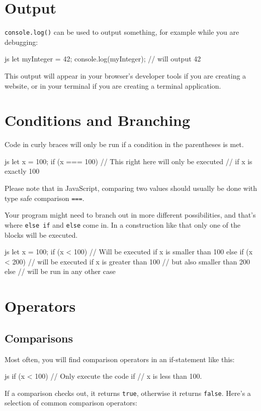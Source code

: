 \documentclass[10pt,a4paper]{article}
\begin{document}
\begin{multicols}{3}
\section*{Output}
\texttt{console.log()} can be used to output something, for example while you are debugging:
\begin{codebox}{js}{}
let myInteger = 42;
console.log(myInteger); // will output 42
\end{codebox}
This output will appear in your browser's developer tools if you are creating a website, or in your terminal if you are creating a terminal application.


\section*{Conditions and Branching}
Code in curly braces will only be run if a condition in the parentheses is met.

\begin{codebox}{js}{}
  let x = 100;
  if (x === 100) {
    // This right here will only be executed
    // if x is exactly 100
  }
\end{codebox}
Please note that in JavaScript, comparing two values should usually be done with type safe comparison \texttt{===}.

Your program might need to branch out in more different possibilities, and that's where \texttt{else if} and \texttt{else} come in. In a construction like that only one of the blocks will be executed.
\begin{codebox}{js}{}
  let x = 100;
  if (x < 100) {
    // Will be executed if x is smaller than 100
  } else if (x < 200) {
    // will be executed if x is greater than 100
    // but also smaller than 200
  } else {
    // will be run in any other case
  }
\end{codebox}


\section*{Operators}
\subsection*{Comparisons}
Most often, you will find comparison operators in an if-statement like this:

\begin{codebox}{js}{}
  if (x < 100) {
    // Only execute the code if
    // x is less than 100.
  }
\end{codebox}
If a comparison checks out, it returns \texttt{true}, otherwise it returns \texttt{false}. Here's a selection of common comparison operators:


\end{multicols}
\end{document}
